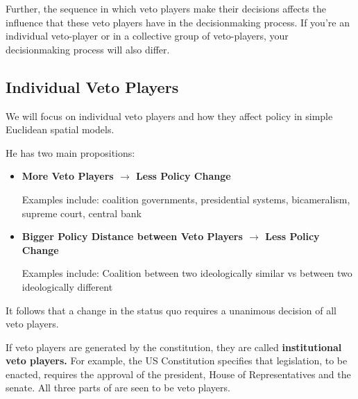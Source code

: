 \documentclass[12pt, letterpaper]{article}
\begin{document}
Further, the sequence in which veto players make their decisions affects the influence that these veto players have in the decisionmaking process. If you're an individual veto-player or in a collective group of veto-players, your decisionmaking process will also differ.

\subsection{Individual Veto Players}
We will focus on individual veto players and how they affect policy in simple Euclidean spatial models.

He has two main propositions:
\begin{itemize}
	\item \textbf{More Veto Players $\rightarrow$ Less Policy Change}
	
	Examples include: coalition governments, presidential systems, bicameralism, supreme court, central bank
	\item \textbf{Bigger Policy Distance between Veto Players $\rightarrow$ Less Policy Change}
	
	Examples include: Coalition between two ideologically similar vs between two ideologically different
\end{itemize}

It follows that a change in the status quo requires a unanimous decision of all veto players. 

If veto players are generated by the constitution, they are called \textbf{institutional veto players.} For example, the US Constitution specifies that legislation, to be enacted, requires the approval of the president, House of Representatives and the senate. All three parts of are seen to be veto players.
\end{document}
